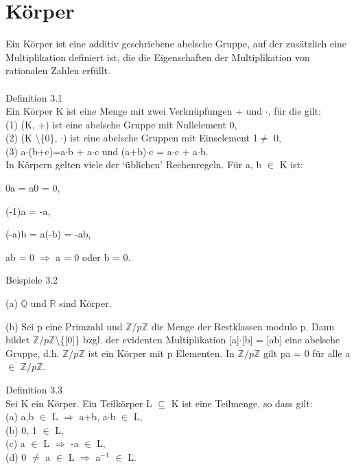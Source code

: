 \section{Körper}
Ein Körper ist eine additiv geschriebene abelsche Gruppe, auf der zusätzlich eine Multiplikation definiert ist, die die Eigenschaften der Multiplikation von rationalen Zahlen erfüllt. \\
\\
Definition 3.1\\
Ein Körper K ist eine Menge mit zwei Verknüpfungen + und $\cdot$, für die gilt: \\
(1) (K, +) ist eine abelsche Gruppe mit Nullelement 0,\\ 
(2) (K \textbackslash \{0\}, $\cdot$) ist eine abelsche Gruppen mit Einselement 1$\neq$ 0,\\
(3) a$\cdot$(b+c)=a$\cdot$b + a$\cdot$c und (a+b)$\cdot$c = a$\cdot$c + a$\cdot$b.\\
In Körpern gelten viele der ‘üblichen’ Rechenregeln. Für a, b $\in$ K ist:
\begin{compactitem} 
\item 0a = a0 = 0, 
\item (-1)a = -a, 
\item (-a)b = a(-b) = -ab, 
\item ab = 0 $\Rightarrow$ a = 0 oder b = 0. \\
\end{compactitem}
Beispiele 3.2
\begin{compactenum}
\item[(a)] $\mathbb{Q}$ und $\mathbb{R}$ sind Körper.
\item[(b)] Sei p eine Primzahl und $\mathbb{Z}/p\mathbb{Z}$ die Menge der Restklassen modulo p. Dann bildet $\mathbb{Z}/p\mathbb{Z}$\textbackslash\{[0]\} bzgl. der evidenten Multiplikation [a]$\cdot$[b] = [ab] eine abelsche Gruppe, d.h. $\mathbb{Z}/p\mathbb{Z}$ ist ein Körper mit p Elementen. In $\mathbb{Z}/p\mathbb{Z}$ gilt pa = 0 für alle a $\in$ $\mathbb{Z}/p\mathbb{Z}$.\\
\end{compactenum}
Definition 3.3\\
Sei K ein Körper. Ein Teilkörper L $\subseteq$ K ist eine Teilmenge, so dass gilt:\\
(a) a,b $\in$ L $\Rightarrow$ a+b, a$\cdot$b $\in$ L, \\
(b) 0, 1 $\in$ L,\\
(c) a $\in$ L $\Rightarrow$ -a $\in$ L,\\ 
(d) 0 $\neq$ a $\in$ L $\Rightarrow$ a$^{-1}$ $\in$ L.\\
